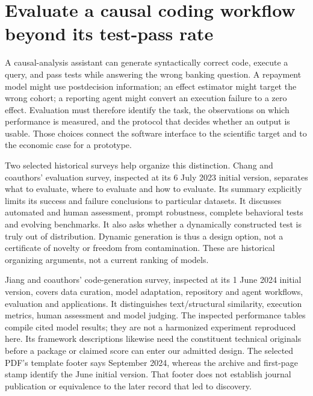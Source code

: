 \label{exec17:validity-development-end}


\section{Evaluate a causal coding workflow beyond its test-pass rate}
\label{exec19:evalcode-scope}

A causal-analysis assistant can generate syntactically correct code, execute a
query, and pass tests while answering the wrong banking question. A repayment
model might use postdecision information; an effect estimator might target the
wrong cohort; a reporting agent might convert an execution failure to a zero
effect. Evaluation must therefore identify the task, the observations on which
performance is measured, and the protocol that decides whether an output is
usable. Those choices connect the software interface to the scientific target
and to the economic case for a prototype.

Two selected historical surveys help organize this distinction. Chang and
coauthors' evaluation survey, inspected at its 6 July 2023 initial version,
separates what to evaluate, where to evaluate and how to evaluate. Its summary
explicitly limits its success and failure conclusions to particular datasets.
It discusses automated and human assessment, prompt robustness, complete
behavioral tests and evolving benchmarks. It also asks whether a dynamically
constructed test is truly out of distribution. Dynamic generation is thus a
design option, not a certificate of novelty or freedom from contamination.
These are historical organizing arguments, not a current ranking of models.
\citep{exec19_surveys_evaluation}

Jiang and coauthors' code-generation survey, inspected at its 1 June 2024
initial version, covers data curation, model adaptation, repository and agent
workflows, evaluation and applications. It distinguishes text/structural
similarity, execution metrics, human assessment and model judging. The inspected
performance tables compile cited model results; they are not a harmonized
experiment reproduced here. Its framework descriptions likewise need the
constituent technical originals before a package or claimed score can enter
our admitted design. The selected PDF's template footer says September 2024,
whereas the archive and first-page stamp identify the June initial version.
That footer does not establish journal publication or equivalence to the later
record that led to discovery.~\citep{exec19_surveys_code}


